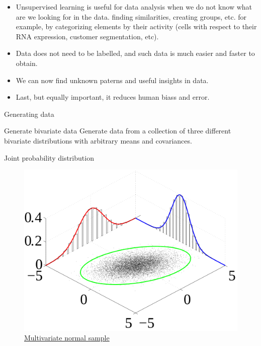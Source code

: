 \documentclass{beamer}
\begin{document}
\begin{frame}
    \begin{itemize}
        \item Unsupervised learning is useful for data analysis when we do not know what are we looking for in the data. finding similarities, creating groups, etc. for example, by categorizing elements by their activity (cells with respect to their RNA expression, customer segmentation, etc).
        \item Data does not need to be labelled, and such data is much easier and faster to obtain.
        \item We can now find unknown paterns and useful insights in data.
        \item Last, but equally important, it reduces human biass and error.
    \end{itemize}
\end{frame}



\begin{frame}{Generating data}
    \begin{Exercise}{Generate bivariate data}
        Generate data from a collection of three different bivariate distributions with arbitrary means and covariances.
    \end{Exercise}
\end{frame}


\begin{frame}{Joint probability distribution}
    \begin{figure}
        \includegraphics[width=0.6\linewidth]{Multivariate_normal_sample}
        \caption{\href{https://commons.wikimedia.org/wiki/File:Multivariate_normal_sample.svg}{Multivariate normal sample}}
    \end{figure}
\end{frame}
\end{document}
